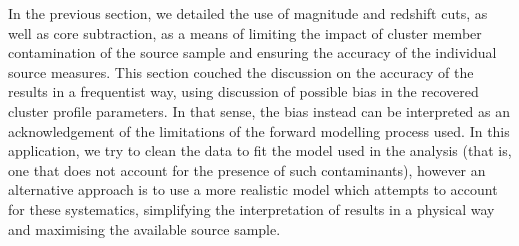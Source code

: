 \documentclass[useAMS,usenatbib,times,letter,amssymb]{mn2e}
\begin{document}

In the previous section, we detailed the use of magnitude and redshift cuts, as well as core subtraction, as a means of limiting the impact of cluster member contamination of the source sample and ensuring the accuracy of the individual source measures. This section couched the discussion on the accuracy of the results in a frequentist way, using discussion of possible bias in the recovered cluster profile parameters. In that sense, the bias instead can be interpreted as an acknowledgement of the limitations of the forward modelling process used. In this application, we try to clean the data to fit the model used in the analysis (that is, one that does not account for the presence of such contaminants), however an alternative approach is to use a more realistic model which attempts to account for these systematics, simplifying the interpretation of results in a physical way and maximising the available source sample.
\end{document}
